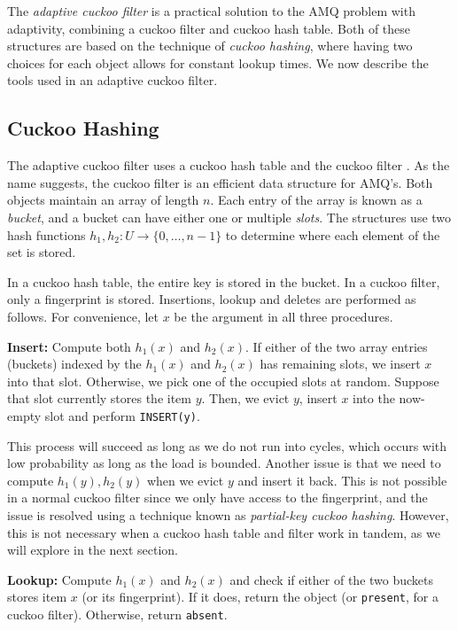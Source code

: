 \documentclass[../paper.tex]{subfiles}
\begin{document}
\newcommand{\on}{\operatorname}
The \emph{adaptive cuckoo filter} \cite{adaptive-cuckoo} is a practical solution to the AMQ problem with adaptivity, combining a cuckoo filter and cuckoo hash table. Both of these structures are based on the
technique of \emph{cuckoo hashing}, where having two choices for each object allows for constant lookup times. We now describe the tools used in an adaptive cuckoo filter.

\subsection{Cuckoo Hashing}
The adaptive cuckoo filter uses a cuckoo hash table \cite{cuckoo-hash} and the cuckoo filter \cite{cuckoo-filter}. As the name suggests, the cuckoo filter is an
efficient data structure for AMQ's. Both objects maintain an array of length $n$. Each entry of the array is known as a \emph{bucket}, and a bucket can have either one or multiple \emph{slots}.
The structures use two hash functions $h_1,h_2:U\to \{0,\ldots,n-1\}$ to determine where each element of the set is stored.

In a cuckoo hash table, the entire key is stored in the bucket. In a cuckoo filter, only a fingerprint is stored. Insertions, lookup and deletes are performed as follows. For convenience, let $x$ be the argument in all three procedures.

\textbf{Insert:} Compute both $h_1(x)$ and $h_2(x)$. If either of the two array entries (buckets) indexed by the $h_1(x)$ and $h_2(x)$ has remaining slots, we insert $x$ into that slot.
Otherwise, we pick one of the occupied slots at random. Suppose that slot currently stores the item $y$. Then, we evict $y$, insert $x$ into the now-empty slot and perform \texttt{INSERT(y)}.

This process will succeed as long as we do not run into cycles, which occurs with low probability as long as the load is bounded. Another issue is that we need to compute $h_1(y),h_2(y)$
when we evict $y$ and insert it back. This is not possible in a normal cuckoo filter since we only have access to the fingerprint, and the issue is resolved using a technique known as \emph{partial-key cuckoo hashing}.
However, this is not necessary when a cuckoo hash table and filter work in tandem, as we will explore in the next section.

\textbf{Lookup:} Compute $h_1(x)$ and $h_2(x)$ and check if either of the two buckets stores item $x$ (or its fingerprint). If it does, return the object (or \texttt{present}, for a cuckoo filter). Otherwise, return \texttt{absent}.
\end{document}
